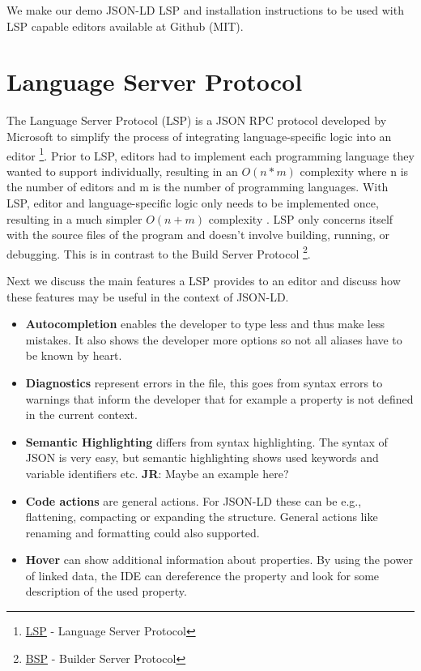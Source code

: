 \documentclass[
]{ceurart}
\newcommand\jr[1]{{\color{Red}\textbf{JR}: #1}}
\begin{document}
We make our demo JSON-LD LSP and installation instructions to be used with LSP capable editors available at Github (MIT).


\section{Language Server Protocol}

The Language Server Protocol (LSP) is a JSON RPC protocol developed by Microsoft to simplify the process of integrating language-specific logic into an editor \footnote{\href{https://microsoft.github.io/language-server-protocol/}{LSP} - Language Server Protocol}. 
Prior to LSP, editors had to implement each programming language they wanted to support individually, resulting in an \(O(n*m)\) complexity where n is the number of editors and m is the number of programming languages.
With LSP, editor and language-specific logic only needs to be implemented once, resulting in a much simpler \(O(n+m)\) complexity \cite{LSP-Multi}.
LSP only concerns itself with the source files of the program and doesn't involve building, running, or debugging.
This is in contrast to the Build Server Protocol \footnote{\href{https://github.com/build-server-protocol/build-server-protocol}{BSP} - Builder Server Protocol}.

Next we discuss the main features a LSP provides to an editor and discuss how these features may be useful in the context of JSON-LD.

\begin{itemize}
  \item \textbf{Autocompletion} enables the developer to type less and thus make less mistakes. It also shows the developer more options so not all aliases have to be known by heart.
  \item \textbf{Diagnostics} represent errors in the file, this goes from syntax errors to warnings that inform the developer that for example a property is not defined in the current context.
  \item \textbf{Semantic Highlighting} differs from syntax highlighting. The syntax of JSON is very easy, but semantic highlighting shows used keywords and variable identifiers etc. \jr{Maybe an example here?}
  \item \textbf{Code actions} are general actions. For JSON-LD these can be e.g., flattening, compacting or expanding the structure. General actions like renaming and formatting could also supported.
  \item \textbf{Hover} can show additional information about properties. By using the power of linked data, the IDE can dereference the property and look for some description of the used property.
\end{itemize}
\end{document}
